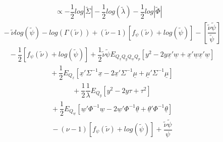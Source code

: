 \documentclass[fleqn]{minimal}
\begin{document}
\begin{align*}
  \ \ \ \ \ \
  \propto
  -\dfrac{1}{2}
  log \left| \tilde{\Sigma} \right|
  -\dfrac{1}{2}
  log \left(
    \tilde{\lambda}
  \right)
  - \dfrac{1}{2}
  log \left| \tilde{\Phi} \right|
\end{align*}
\begin{align*}
  \ \ \ \ \ \ \ \ \ \
  -
  \tilde{\nu}
  log \left(
    \tilde{\psi}
  \right)
  -
  log \left(
    \Gamma(\tilde{\nu})
  \right)
  +
  \left( \tilde{\nu}-1 \right)
  \left[
    f_{\psi} \left( \tilde{\nu} \right)
    + log\left( \tilde{\psi} \right)
  \right]
  - 
  \left[
    \dfrac{\tilde{\nu} \tilde{\psi}}{\tilde{\psi}}
  \right]
\end{align*}
\begin{align*}
  \ \ \ \ \ \ \ \ \ \
  - \dfrac{1}{2}
  \left[
    f_{\psi} \left( \tilde{\nu} \right)
    + log\left( \tilde{\psi} \right)
  \right]
  + \dfrac{1}{2}
  \tilde{\nu} \tilde{\psi}
  E_{Q_{\underline{x}} Q_{y} Q_{\underline{w}} Q_{p}}
  \left[
    y^2
    - 2 y\underline{x}'\underline{w}
    + \underline{x}'\underline{w}\underline{x}'\underline{w}
  \right]
\end{align*}
\begin{align*}
  \ \ \ \ \ \ \ \ \ \
  +\dfrac{1}{2}
  E_{Q_{\underline{x}}} \left[
    \underline{x}'\Sigma^{-1}\underline{x}
    - 2 \underline{x}'\Sigma^{-1}\underline{\mu}
    + \underline{\mu}'\Sigma^{-1}\underline{\mu}
  \right]
\end{align*}
\begin{align*}
  \ \ \ \ \ \ \ \ \ \
  +\dfrac{1}{2}
  \dfrac{1}{\lambda}
  E_{Q_{y}} \left[
    y^2
    - 2 y\tau
    +\tau^2
  \right]
\end{align*}
\begin{align*}
  \ \ \ \ \ \ \ \ \ \
  + \dfrac{1}{2}
  E_{Q_{\underline{w}}} \left[
    \underline{w}'\Phi^{-1}\underline{w}
    - 2 \underline{w}'\Phi^{-1}\underline{\theta}
    + \underline{\theta}'\Phi^{-1}\underline{\theta}
  \right]
\end{align*}
\begin{align*}
  \ \ \ \ \ \ \ \ \ \
  -
  \left( \nu-1 \right)
  \left[
    f_{\psi} \left( \tilde{\nu} \right)
    + log\left( \tilde{\psi} \right)
  \right]
  + 
  \dfrac{\tilde{\nu} \tilde{\psi}}{\psi}
\end{align*}
\end{document}
